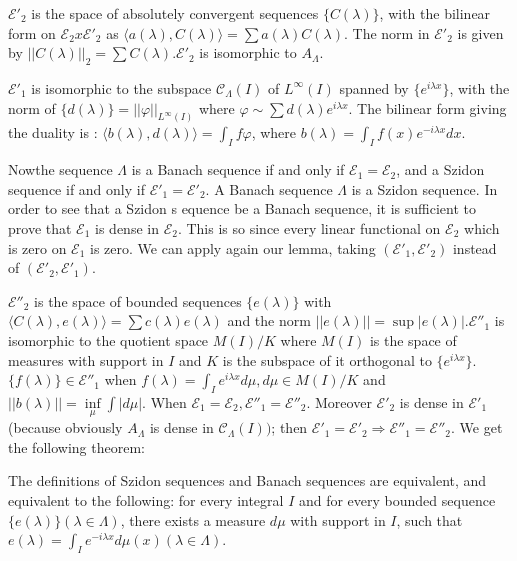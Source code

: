 $\mathscr{E}'_2$ is the space of absolutely convergent sequences $\{ C
(\lambda) \}$, with the bilinear form on $\mathscr{E}_2 x
\mathscr{E}'_2$ as $\langle a(\lambda), C (\lambda) \rangle = \sum a
(\lambda) C (\lambda)$. The norm in $\mathscr{E}'_2$ is given by $|| C
(\lambda) ||_2 = \sum C(\lambda). \mathscr{E}'_2$ is isomorphic to
$A_\Lambda$. 

$\mathscr{E}'_1$ is isomorphic to the subspace $\mathscr{C}_\Lambda
(I)$ of $L^\infty (I)$ spanned by $\big \{ e^{i \lambda x} \big\}$,
with the norm of $\{d (\lambda)\} = || \varphi ||_{L^\infty (I)}$
where $\varphi \sim \sum d (\lambda) e^{i \lambda x}$. The bilinear
form giving the duality is : $\langle b (\lambda), d (\lambda) \rangle
= \int_I f \varphi$, where $b(\lambda) = \int_I f(x) e^{-i \lambda x }
dx$. 

Now\pageoriginale the sequence $\Lambda$ is a Banach sequence if and only if
$\mathscr{E}_1 = \mathscr{E}_2$, and a Szidon sequence if and only if
$\mathscr{E}'_1 = \mathscr{E}'_2$. A Banach sequence $\Lambda$ is a
Szidon sequence. In order to see that a Szidon s equence be a Banach
sequence, it is sufficient to prove that $\mathscr{E}_1$ is dense in
$\mathscr{E}_2$. This is so since every linear functional on
$\mathscr{E}_2$ which is zero on $\mathscr{E}_1$ is zero. We can apply
again our lemma, taking $(\mathscr{E}'_1, \mathscr{E}'_2)$ instead of
$(\mathscr{E}'_2, \mathscr{E}'_1)$. 

$\mathscr{E}''_2$ is the space of bounded sequences $\big \{ e
(\lambda) \big\}$ with $\langle C(\lambda), e (\lambda) \rangle = \sum
c (\lambda) e(\lambda)$ and the norm $|| e (\lambda) || = \sup \big |
e(\lambda) \big |. \mathscr{E}''_1$ is isomorphic to the quotient space
$M(I) /K$ where $M(I) $ is the space of measures with support in $I$
and $K$ is the subspace of it orthogonal to $\big \{e^{i \lambda x}
\big \}$. $\big \{ f (\lambda) \big \} \in \mathscr{E}''_1$ when $f
(\lambda) = \int_I e^{i \lambda x} d \mu, d \mu \in M(I) /K$ and $|| b
(\lambda) || = \inf\limits_{\mu} \int | d \mu |$. When $\mathscr{E}_1
= \mathscr{E}_2, \mathscr{E}''_1 = \mathscr{E}''_2$. Moreover
$\mathscr{E}'_2$ is dense 
in $\mathscr{E}'_1$ (because obviously $A_\Lambda$ is dense in
$\mathscr{C}_ \Lambda (I))$; then $\mathscr{E}'_1 = \mathscr{E}'_2
\Rightarrow \mathscr{E}''_1 = \mathscr{E}''_2$. We get the following
theorem: 
\begin{theorem*}
 The definitions of Szidon sequences and Banach sequences are
 equivalent, and equivalent to the following: for every integral $I$
 and for every bounded sequence $\big \{e (\lambda) \big \} ( \lambda
 \in \Lambda)$, there exists a measure $d \mu$ with support in $I$,
 such that $e(\lambda) = \int_I e^{-i \lambda x} d \mu (x) (\lambda
 \in \Lambda)$. 
\end{theorem*}


